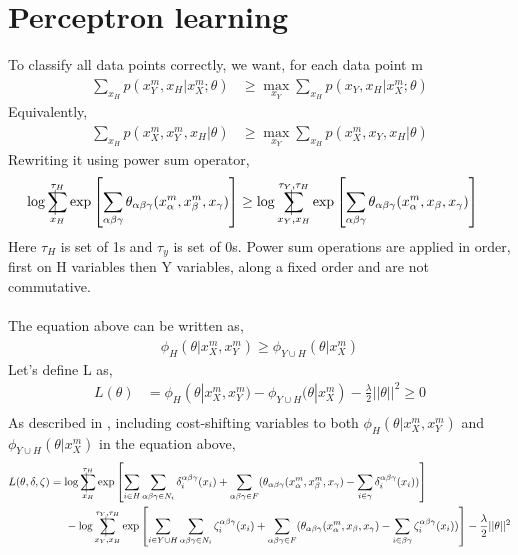 \documentclass{article}
\makeatletter
\newcommand{\avsum}{\mathop{\mathpalette\avsuminner\relax}\displaylimits}
\newcommand\avsuminner[2]{%
  {\sbox0{$\m@th#1\sum$}%
   \vphantom{\usebox0}%
   \ooalign{%
     \hidewidth
     \smash{\vrule height\dimexpr\ht0+1pt\relax depth\dimexpr\dp0+1pt\relax}%
     \hidewidth\cr
     $\m@th#1\sum$\cr
   }%
  }%
}
\makeatother
\begin{document}
\section{Perceptron learning}
To classify all data points correctly, we want, for each data point m
\begin{align*}
  \sum_{x_H} p(x_Y^m,x_H|x_X^m;\theta) &\geq \max_{x_Y}\sum_{x_H} p(x_Y,x_H|x_X^m;\theta)
\end{align*}
Equivalently,
\begin{align*}
  \sum_{x_H} p(x_X^m,x_Y^m,x_H|\theta) &\geq \max_{x_Y}\sum_{x_H} p(x_X^m,x_Y,x_H|\theta)
  \end{align*}
  Rewriting it using power sum operator,
  \begin{align*}
  \log\avsum_{x_H}^{\tau_H}\exp\left [\sum_{\alpha\beta\gamma}\theta_{\alpha\beta\gamma}(x_{\alpha}^m,x_{\beta}^m,x_{\gamma})\right ] &\geq \log\avsum_{x_Y,x_H}^{\tau_Y,\tau_H}\exp\left [\sum_{\alpha\beta\gamma}\theta_{\alpha\beta\gamma}(x_{\alpha}^m,x_{\beta},x_{\gamma})\right ]
\end{align*}
Here $\tau_H$ is set of 1s and $\tau_y$ is set of 0s. Power sum operations are applied in order, first on H variables then Y variables, along a fixed order and are not commutative.\\\\The equation above can be written as,
\begin{align*}
\phi_H(\theta|x_X^m,x_Y^m)\geq\phi_{Y\cup H}(\theta|x_X^m)
\end{align*}
Let's define L as,
\begin{align*}
  L(\theta)&=\phi_H(\theta|x_X^m,x_Y^m) - \phi_{Y\cup H}(\theta|x_X^m)- \frac{\lambda}{2}||\theta||^2 \geq 0\\
  \end{align*}
As described in \cite{Ping2015}, including cost-shifting variables to both $\phi_H(\theta|x_X^m,x_Y^m)$ and $\phi_{Y\cup H}(\theta|x_X^m)$ in the equation above,
\begin{align*}
  L(\theta,\delta,\zeta)&=\log\avsum_{x_H}^{\tau_H}\exp\left [ \sum_{i\in H}\sum_{\alpha\beta\gamma \in N_i} \delta_i^{\alpha\beta\gamma}(x_i) + \sum_{\alpha\beta\gamma \in F}(\theta_{\alpha\beta\gamma}(x_{\alpha}^m,x_{\beta}^m,x_{\gamma})-\sum_{i\in \gamma}\delta_i^{\alpha\beta\gamma}(x_i)) \right ] \\&\hspace{5mm}-\log\avsum_{x_Y,x_H}^{\tau_Y,\tau_H}\exp\left [ \sum_{i\in Y\cup H}\sum_{\alpha\beta\gamma \in N_i} \zeta_i^{\alpha\beta\gamma}(x_i) + \sum_{\alpha\beta\gamma \in F}(\theta_{\alpha\beta\gamma}(x_{\alpha}^m,x_{\beta},x_{\gamma})-\sum_{i\in \beta\gamma}\zeta_i^{\alpha\beta\gamma}(x_i)) \right ] - \frac{\lambda}{2}||\theta||^2
\end{align*}
\end{document}
